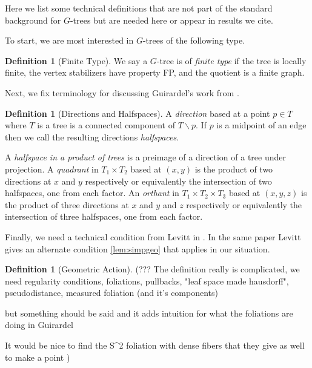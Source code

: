 \documentclass[12pt,parskip=full]{report}
\theoremstyle{plain}
\theoremstyle{definition}
\newtheorem{dfn}[thm]{Definition}
\begin{document}
Here we list some technical definitions that are not part of the standard background for \(G\)-trees but are needed here or appear in results we cite.

To start, we are most interested in \(G\)-trees of the following type.
\begin{dfn}
    [Finite Type]
    \label{defn:finitetype} 
    We say a $G$-tree is of \emph{finite type} if the tree is locally finite, the vertex stabilizers have property FP, and the quotient is a finite graph.
\end{dfn}

Next, we fix terminology for discussing Guirardel's work from \cite{guirardelcorepaper}.

\begin{dfn}
    [Directions and Halfspaces]
    \label{dfn:directionhalfspaces}
    A \emph{direction} based at a point \(p\in T\) where \(T\) is a tree is a connected component of \(T\smallsetminus p\). If \(p\) is a midpoint of an edge then we call the resulting directions \emph{halfspaces}.
    
    A \emph{halfspace in a product of trees} is a preimage of a direction of a tree under projection. A \emph{quadrant} in \(T_1\times T_2\) based at \((x,y)\) is the product of two directions at \(x\) and \(y\) respectively or equivalently the intersection of two halfspaces, one from each factor. An \emph{orthant} in \(T_1\times T_2\times T_3\) based at \((x,y,z)\) is the product of three directions at \(x\) and \(y\) and \(z\) respectively or equivalently the intersection of three halfspaces, one from each factor.
\end{dfn}

Finally, we need a technical condition from Levitt in \cite{levitt}. In the same paper Levitt gives an alternate condition \ref{lem:simpgeo} that applies in our situation.
 \begin{dfn}
     [Geometric Action]
     \label{defn:geometricaction}
      (??? The definition really is complicated, we need regularity conditions, foliations, pullbacks, "leaf space made hausdorff", pseudodistance, measured foliation (and it's components)
      
      but something should be said and it adds intuition for what the foliations are doing in Guirardel
      
      It would be nice to find the S^2 foliation with dense fibers that they give as well to make a point
      )
 \end{dfn}
 
\end{document}
